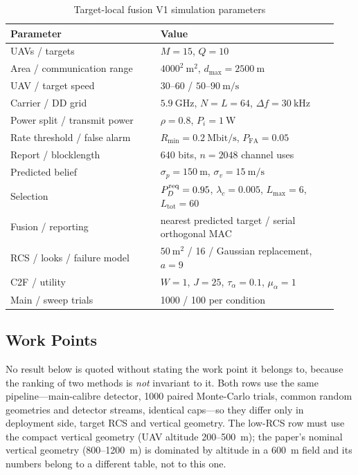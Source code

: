 \begin{table}[!t]
	\centering
	\caption{Target-local fusion V1 simulation parameters}
	\label{tab:simulation_parameters}
	\footnotesize
	\setlength{\tabcolsep}{3pt}
	\begin{tabular}{@{}p{0.43\linewidth}p{0.51\linewidth}@{}}
		\toprule
		Parameter & Value \\
		\midrule
		UAVs / targets & $M=15$, $Q=10$ \\
		Area / communication range & $4000^2~\mathrm{m}^2$, $d_{\max}=2500~\mathrm m$ \\
		UAV / target speed & $30$--$60$ / $50$--$90~\mathrm{m/s}$ \\
		Carrier / DD grid & $5.9~\mathrm{GHz}$, $N=L=64$, $\Delta f=30~\mathrm{kHz}$ \\
		Power split / transmit power & $\rho=0.8$, $P_i=1~\mathrm W$ \\
		Rate threshold / false alarm & $R_{\min}=0.2~\mathrm{Mbit/s}$, $P_{\mathrm{FA}}=0.05$ \\
		Report / blocklength & 640 bits, $n=2048$ channel uses \\
		Predicted belief & $\sigma_p=150~\mathrm m$, $\sigma_v=15~\mathrm{m/s}$ \\
		Selection & $P_D^{\rm req}=0.95$, $\lambda_c=0.005$, $L_{\max}=6$, $L_{\mathrm{tot}}=60$ \\
		Fusion / reporting & nearest predicted target / serial orthogonal MAC \\
		RCS / looks / failure model & $50~\mathrm{m}^2$ / 16 / Gaussian replacement, $a=9$ \\
		C2F / utility & $W=1$, $J=25$, $\tau_\alpha=0.1$, $\mu_\alpha=1$ \\
		Main / sweep trials & 1000 / 100 per condition \\
		\bottomrule
	\end{tabular}
\end{table}

\subsection{Work Points}
\label{sec:work_points}

No result below is quoted without stating the work point it belongs to, because
the ranking of two methods is \emph{not} invariant to it. Both rows use the same
pipeline---main-calibre detector, 1000 paired Monte-Carlo trials, common random
geometries and detector streams, identical caps---so they differ only in
deployment side, target RCS and vertical geometry. The low-RCS row must use the
compact vertical geometry (UAV altitude 200--500~m); the paper's nominal vertical
geometry (800--1200~m) is dominated by altitude in a 600~m field and its numbers
belong to a different table, not to this one.

